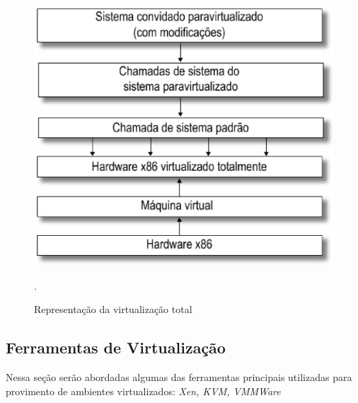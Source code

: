 \begin{figure}[!htb]
\centering
\includegraphics [keepaspectratio=true,scale=0.40]{figuras/paravirtualization.eps}
\caption{Representação da virtualização total}
\cite{marcos}.
\label{paravirtualization}
\end{figure}

\subsection{Ferramentas de Virtualização}
Nessa seção serão abordadas algumas das ferramentas principais utilizadas para provimento de ambientes virtualizados: \textit{Xen, KVM, VMMWare}
